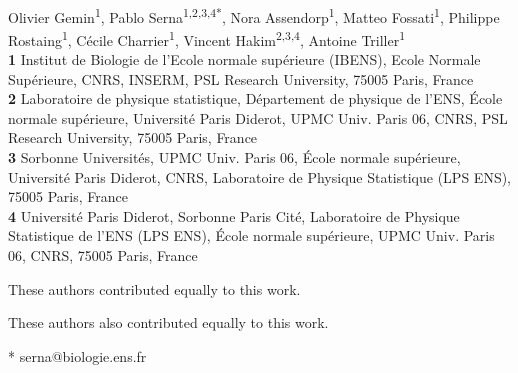 \documentclass[10pt,letterpaper]{article}
\begin{document}
\vspace*{0.2in}

\begin{flushleft}
{\Large
\textbf{} %
}
\newline
\\
Olivier Gemin\textsuperscript{1\ddag},
Pablo Serna\textsuperscript{1,2,3,4*\Yinyang},
Nora Assendorp\textsuperscript{1},
Matteo Fossati\textsuperscript{1},
Philippe Rostaing\textsuperscript{1},
Cécile Charrier\textsuperscript{1},
Vincent Hakim\textsuperscript{2,3,4\Yinyang},
Antoine Triller\textsuperscript{1\ddag}
\\
\bigskip
\textbf{1} Institut de Biologie de l’Ecole normale supérieure (IBENS), Ecole Normale Supérieure, CNRS, INSERM, PSL Research University, 75005 Paris, France
\\
\textbf{2} Laboratoire de physique statistique, Département de physique de l’ENS, École normale supérieure,
Université Paris Diderot, UPMC Univ. Paris 06, CNRS, PSL Research University, 75005 Paris, France
\\
\textbf{3} Sorbonne Universités, UPMC Univ. Paris 06, École normale supérieure, Université Paris Diderot, CNRS,
Laboratoire de Physique Statistique (LPS ENS), 75005 Paris, France
\\
\textbf{4} Université Paris Diderot, Sorbonne Paris Cité, Laboratoire de Physique Statistique de l'ENS (LPS ENS), École
normale supérieure, UPMC Univ. Paris 06, CNRS, 75005 Paris, France
\\
\bigskip

% 
%
\Yinyang These authors contributed equally to this work.

\ddag These authors also contributed equally to this work.




* serna@biologie.ens.fr

\end{flushleft}
\end{document}
